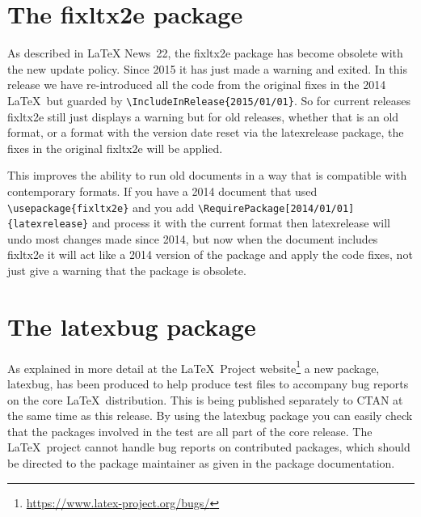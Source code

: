 \documentclass{ltnews}
\begin{document}
\section{The \textsf{fixltx2e} package}
As described in \LaTeX{} News~22, the \textsf{fixltx2e} package has become
obsolete with the new update policy. Since 2015 it has just made a
warning and exited.  In this release we have re-introduced all
the code from the original fixes in the 2014 \LaTeX\ but guarded by
\verb|\IncludeInRelease{2015/01/01}|.
So for current releases \textsf{fixltx2e} still just displays a warning
but for old releases, whether that is an old format, or a format with
the version date reset via  the \textsf{latexrelease} package, the
fixes in the original \textsf{fixltx2e} will be applied.

This improves the ability to run old documents in a way that is compatible
with contemporary formats. If you have a 2014 document that used
\verb|\usepackage{fixltx2e}| and you add
\verb|\RequirePackage[2014/01/01]{latexrelease}| and process it with the
current format then \textsf{latexrelease} will undo most changes made
since 2014, but now when the document includes \textsf{fixltx2e} it
will act like a 2014 version of the package and apply the code fixes,
not just give a warning that the package is obsolete.

\section{The \textsf{latexbug} package}

As explained in more detail
at the \LaTeX\ Project
  website\footnote{\url{https://www.latex-project.org/bugs/}}
a new package, \textsf{latexbug}, has been produced to help produce
test files to accompany bug reports on the core \LaTeX\ distribution.
This is being published separately to CTAN at the same time as this
release. By using the \textsf{latexbug} package you can easily check
that the packages involved in the test are all part of the core
release. The \LaTeX\ project cannot handle bug reports on contributed
packages, which should be directed to the package maintainer as given
in the package documentation.
\end{document}
